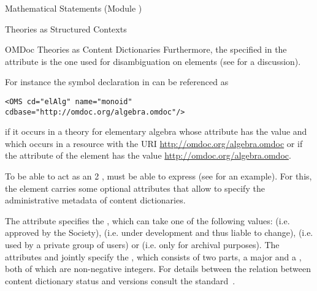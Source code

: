 \begin{tchapter}[id=statements,short=Mathematical Statements]{Mathematical Statements (Module {})}
\begin{tsection}[id=theories]{Theories as Structured Contexts}
\begin{tsubsection}[id=identifying]{OMDoc Theories as Content Dictionaries}
  Furthermore, the {} specified in the {}
  attribute is the one used for disambiguation on {} elements (see
  {} for a discussion).
  
  For instance the symbol declaration in {} can be referenced as
\begin{lstlisting}
<OMS cd="elAlg" name="monoid" cdbase="http://omdoc.org/algebra.omdoc"/>
\end{lstlisting}
if it occurs in a theory for elementary algebra whose
{} attribute has the value {} and which
occurs in a resource with the URI \url{http://omdoc.org/algebra.omdoc} or if the
{} attribute of the {} element has the value
\url{http://omdoc.org/algebra.omdoc}.


To be able to act as an {\openmath}2 {}, {\omdoc} must
be able to express {} (see {} for an
example). For this, the {} element carries some optional attributes that
allow to specify the administrative metadata of {\openmath} content dictionaries.

The {} attribute specifies the {}, which can take one of the following values:
{} (i.e. approved by the {\openmath} Society),
{} (i.e. under development and thus liable to
change), {} (i.e. used by a private group of {\openmath}
users) or {} (i.e. only for archival purposes). The
attributes {} and {} jointly
specify the {}, which consists of two parts, a
major {} and a {}, both of which are non-negative
integers. For details between the relation between content dictionary status and versions
consult the {\openmath} standard~\cite{BusCapCar:2oms04}.


\end{tsubsection}
\end{tsection}
\end{tchapter}
